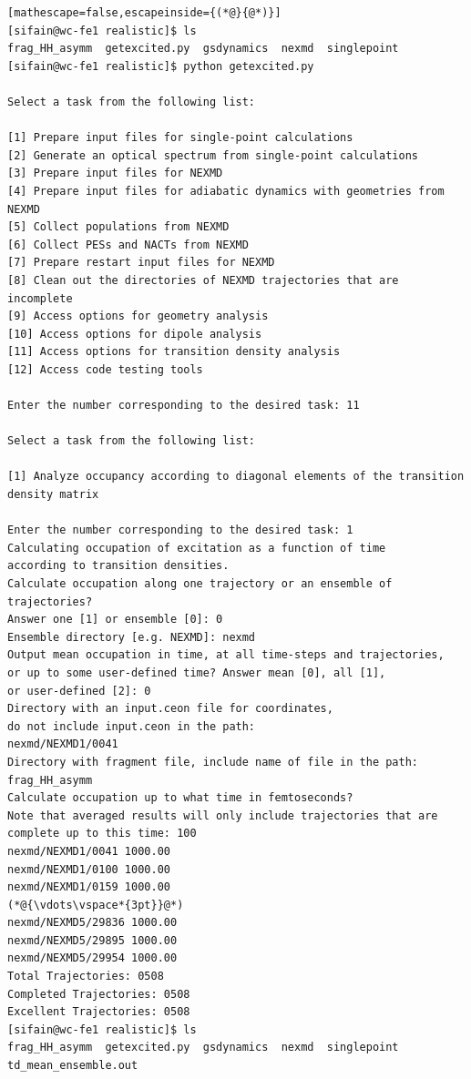 \documentclass[letterpaper,12pt,titlepage]{article}
\begin{document}
\begin{lstlisting}[mathescape=false,escapeinside={(*@}{@*)}]
[sifain@wc-fe1 realistic]$ ls
frag_HH_asymm  getexcited.py  gsdynamics  nexmd  singlepoint
[sifain@wc-fe1 realistic]$ python getexcited.py 

Select a task from the following list:

[1] Prepare input files for single-point calculations
[2] Generate an optical spectrum from single-point calculations
[3] Prepare input files for NEXMD
[4] Prepare input files for adiabatic dynamics with geometries from NEXMD
[5] Collect populations from NEXMD
[6] Collect PESs and NACTs from NEXMD
[7] Prepare restart input files for NEXMD
[8] Clean out the directories of NEXMD trajectories that are incomplete
[9] Access options for geometry analysis
[10] Access options for dipole analysis
[11] Access options for transition density analysis
[12] Access code testing tools

Enter the number corresponding to the desired task: 11

Select a task from the following list:

[1] Analyze occupancy according to diagonal elements of the transition density matrix

Enter the number corresponding to the desired task: 1
Calculating occupation of excitation as a function of time 
according to transition densities.
Calculate occupation along one trajectory or an ensemble of trajectories?
Answer one [1] or ensemble [0]: 0
Ensemble directory [e.g. NEXMD]: nexmd
Output mean occupation in time, at all time-steps and trajectories, 
or up to some user-defined time? Answer mean [0], all [1],
or user-defined [2]: 0
Directory with an input.ceon file for coordinates, 
do not include input.ceon in the path: 
nexmd/NEXMD1/0041
Directory with fragment file, include name of file in the path: frag_HH_asymm
Calculate occupation up to what time in femtoseconds?
Note that averaged results will only include trajectories that are 
complete up to this time: 100
nexmd/NEXMD1/0041 1000.00
nexmd/NEXMD1/0100 1000.00
nexmd/NEXMD1/0159 1000.00
(*@{\vdots\vspace*{3pt}}@*)
nexmd/NEXMD5/29836 1000.00
nexmd/NEXMD5/29895 1000.00
nexmd/NEXMD5/29954 1000.00
Total Trajectories: 0508
Completed Trajectories: 0508
Excellent Trajectories: 0508
[sifain@wc-fe1 realistic]$ ls
frag_HH_asymm  getexcited.py  gsdynamics  nexmd  singlepoint  td_mean_ensemble.out
\end{lstlisting}

\newpage
\end{document}
